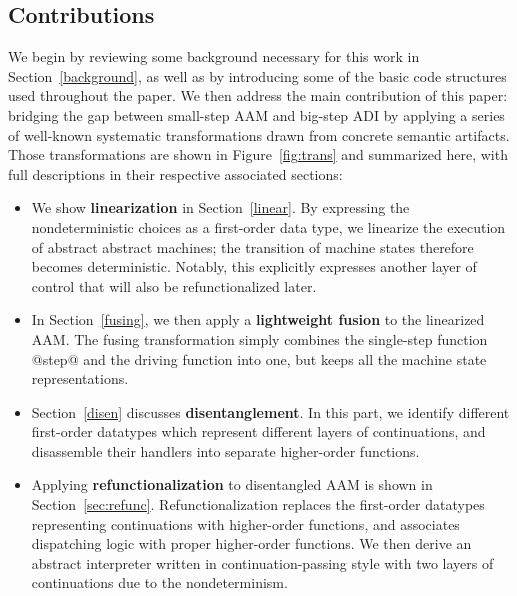\documentclass[acmsmall, review]{acmart}\settopmatter{}
\begin{document}
\subsection{Contributions}

We begin by reviewing some background necessary for this work in Section~\ref{background},
as well as by introducing some of the basic code structures used throughout the paper.
We then address the main contribution of this paper: bridging the gap between
small-step AAM and big-step ADI by applying a series of well-known systematic transformations
drawn from concrete semantic artifacts.
Those transformations are shown in Figure~\ref{fig:trans} and summarized here, with full
descriptions in their respective associated sections:

\begin{itemize}
  \item We show \textbf{linearization} in Section~\ref{linear}. By expressing the
    nondeterministic choices as a first-order data type, we linearize the execution
    of abstract abstract machines; the transition of machine states therefore becomes
    deterministic. Notably, this explicitly expresses another layer of control that
    will also be refunctionalized later.

  \item In Section~\ref{fusing}, we then apply a \textbf{lightweight fusion} 
    \cite{DANVY2008100, Ohori:2007:LFF:1190216.1190241} to the linearized AAM. 
    The fusing transformation simply combines the single-step function @step@ and the 
    driving function into one, but keeps all the machine state representations.

  \item Section~\ref{disen} discusses \textbf{disentanglement}. In this part, we identify 
    different first-order datatypes which represent different layers of continuations, and
    disassemble their handlers into separate higher-order functions.

  \item Applying \textbf{refunctionalization} \cite{DANVY2009534, Danvy:2006:RW:2171265.2171268} 
    to disentangled AAM is shown in Section~\ref{sec:refunc}. 
    Refunctionalization replaces the first-order datatypes representing continuations with
    higher-order functions, and associates dispatching logic with proper higher-order functions. 
    We then derive an abstract interpreter written in continuation-passing style with two
    layers of continuations due to the nondeterminism.


\end{itemize}
\end{document}
